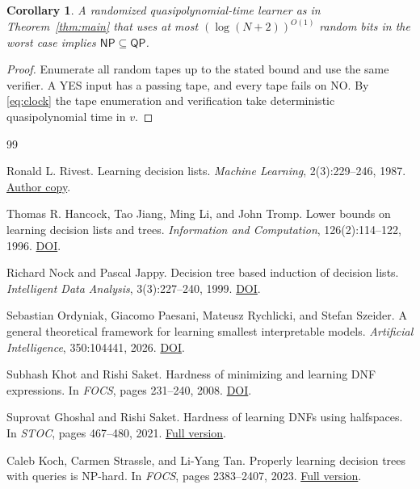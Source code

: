 \documentclass[11pt]{article}
\newtheorem{corollary}[theorem]{Corollary}
\newcommand{\QP}{\mathsf{QP}}
\newcommand{\NP}{\mathsf{NP}}
\begin{document}
\begin{corollary}\label{cor:coins}
A randomized quasipolynomial-time learner as in
Theorem~\ref{thm:main} that uses at most
$(\log(N+2))^{O(1)}$ random bits in the worst case implies
$\NP\subseteq\QP$.
\end{corollary}
\begin{proof}
Enumerate all random tapes up to the stated bound and use the
same verifier. A YES input has a passing tape, and every tape
fails on NO. By \eqref{eq:clock} the tape enumeration and
verification take deterministic quasipolynomial time in $v$.
\end{proof}

\begin{thebibliography}{99}

Ronald L. Rivest.
\newblock Learning decision lists.
\newblock \emph{Machine Learning}, 2(3):229--246, 1987.
\newblock \href{https://people.csail.mit.edu/rivest/pubs/Riv87b.pdf}{Author copy}.

Thomas R. Hancock, Tao Jiang, Ming Li, and John Tromp.
\newblock Lower bounds on learning decision lists and trees.
\newblock \emph{Information and Computation}, 126(2):114--122, 1996.
\newblock \href{https://doi.org/10.1006/inco.1996.0040}{DOI}.

Richard Nock and Pascal Jappy.
\newblock Decision tree based induction of decision lists.
\newblock \emph{Intelligent Data Analysis}, 3(3):227--240, 1999.
\newblock \href{https://doi.org/10.1016/S1088-467X(99)00020-7}{DOI}.

Sebastian Ordyniak, Giacomo Paesani, Mateusz Rychlicki, and Stefan Szeider.
\newblock A general theoretical framework for learning smallest interpretable models.
\newblock \emph{Artificial Intelligence}, 350:104441, 2026.
\newblock \href{https://doi.org/10.1016/j.artint.2025.104441}{DOI}.

Subhash Khot and Rishi Saket.
\newblock Hardness of minimizing and learning DNF expressions.
\newblock In \emph{FOCS}, pages 231--240, 2008.
\newblock \href{https://doi.org/10.1109/FOCS.2008.37}{DOI}.

Suprovat Ghoshal and Rishi Saket.
\newblock Hardness of learning DNFs using halfspaces.
\newblock In \emph{STOC}, pages 467--480, 2021.
\newblock \href{https://arxiv.org/abs/1911.06358}{Full version}.

Caleb Koch, Carmen Strassle, and Li-Yang Tan.
\newblock Properly learning decision trees with queries is NP-hard.
\newblock In \emph{FOCS}, pages 2383--2407, 2023.
\newblock \href{https://arxiv.org/abs/2307.04093}{Full version}.


\end{thebibliography}
\end{document}
